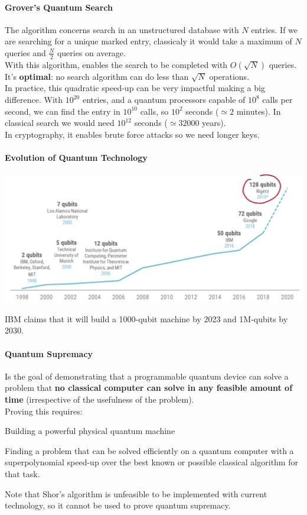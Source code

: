 \documentclass[10pt]{report}
\begin{document}
\paragraph{Grover's Quantum Search} The algorithm concerns search in an unstructured database with $N$ entries. If we are searching for a unique marked entry, classicaly it would take a maximum of $N$ queries and $\frac{N}{2}$ queries on average.\\
With this algorithm, enables the search to be completed with $O(\sqrt{N})$ queries. It's \textbf{optimal}: no search algorithm can do less than $\sqrt{N}$ operations.\\
In practice, this quadratic speed-up can be very impactful making a big difference. With $10^{20}$ entries, and a quantum processors capable of $10^8$ calls per second, we can find the entry in $10^{10}$ calls, so $10^2$ seconds ($\simeq 2$ minutes). In classical search we would need $10^{12}$ seconds ($\simeq 32000$ years).\\
In cryptography, it enables brute force attacks so we need longer keys.
\paragraph{Evolution of Quantum Technology}
\begin{center}
	\includegraphics[scale=0.5]{6.png}
\end{center}
IBM claims that it will build a 1000-qubit machine by 2023 and 1M-qubits by 2030.
\paragraph{Quantum Supremacy} Is the goal of demonstrating that a programmable quantum device can solve a problem that \textbf{no classical computer can solve in any feasible amount of time} (irrespective of the usefulness of the problem).\\
Proving this requires:\begin{list}{}{}
	\item Building a powerful physical quantum machine
	\item Finding a problem that can be solved efficiently on a quantum computer with a superpolynomial speed-up over the best known or possible classical algorithm for that task.
\end{list}
Note that Shor's algorithm is unfeasible to be implemented with current technology, so it cannot be used to prove quantum supremacy.
\end{document}
